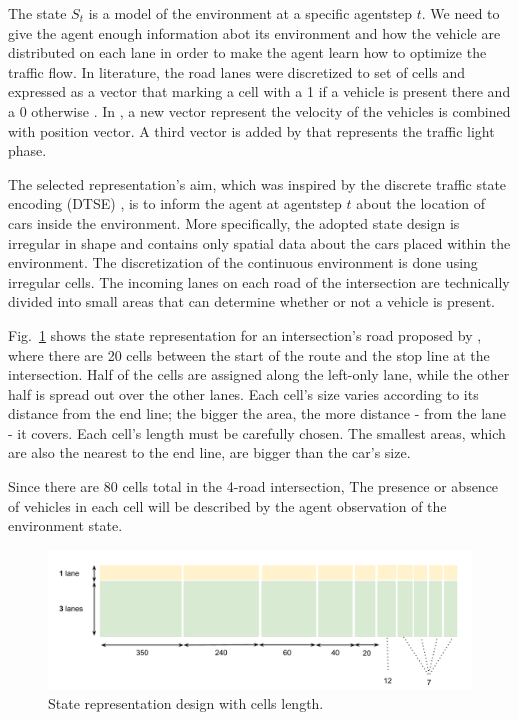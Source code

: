 \documentclass[conference]{IEEEtran}
\begin{document}
The state $S_{t}$ is a model of the environment at a specific agentstep $t$. We need to give the agent enough information abot its environment and how the vehicle are distributed on each lane in order to make the agent learn how to optimize the traffic flow. In literature, the road lanes were discretized to set of cells and expressed as a vector that marking a cell with a 1 if a vehicle is present there and a 0 otherwise \cite{state}. In \cite{Adaptive}, a new vector represent the velocity of the vehicles is combined with position vector. A third vector is added by \cite{genders2016using} that represents the traffic light phase. 

The selected representation's aim, which was inspired by the discrete traffic state encoding (DTSE) \cite{genders2016using}, is to inform the agent at agentstep $t$ about the location of cars inside the environment.
More specifically, the adopted state design is irregular in shape and contains only spatial data about the cars placed within the environment. The discretization of the continuous environment is done using irregular cells. The incoming lanes on each road of the intersection are technically divided into small areas that can determine whether or not a vehicle is present.

Fig.~\ref{fig:3} shows the state representation for an intersection's road proposed by \cite{Deep}, where there are 20 cells between the start of the route and the stop line at the intersection. Half of the cells are assigned along the left-only lane, while the other half is spread out over the other lanes. Each cell's size varies according to its distance from the end line; the bigger the area, the more distance - from the lane - it covers. Each cell's length must be carefully chosen. The smallest areas, which are also the nearest to the end line, are bigger than the car's size. 

Since there are 80 cells total in the 4-road intersection, The presence or absence of vehicles in each cell will be described by the agent observation of the environment state.

\begin{figure}[H]
    \centering
    \begin{center}
    \includegraphics[scale=0.31]{images/State cells length.pdf}
    \end{center}
    \caption{State representation design with cells length.}
    \label{fig:3}
\end{figure}
\end{document}
